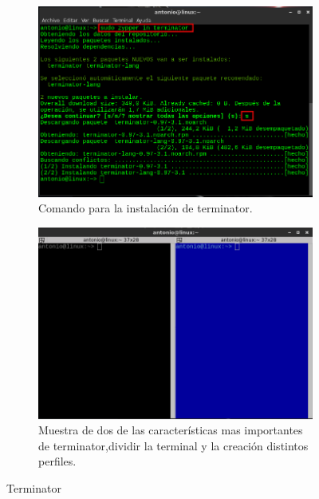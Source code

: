 \begin{figure}[H]
    \centering
    \begin{subfigure}[b]{0.55\textwidth}
        \includegraphics[width=\textwidth]{imagenes/img11}
        \caption{Comando para la instalación de terminator.}
        \label{fig10}
    \end{subfigure}
    \begin{subfigure}[b]{0.4\textwidth}
        \includegraphics[width=\textwidth]{imagenes/img10}
        \caption{Muestra de dos de las características mas importantes de terminator,dividir la terminal y la creación distintos perfiles.}
        \label{fig11}
    \end{subfigure}
    \caption{Terminator}
\end{figure}



